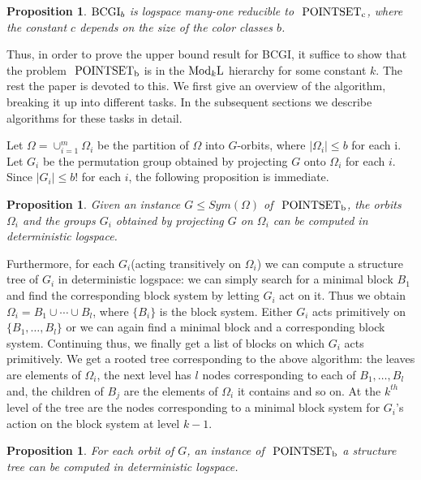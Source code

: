 \documentclass[11pt]{article}
\newtheorem{proposition}[theorem]{Proposition}
\newcommand{\ModkL}{\mbox{\rm Mod$_k$L}}
\newcommand{\BCGI}{\mbox{\rm BCGI}}
\newcommand{\psb}[2]{\mbox{\ensuremath{\rm{#1~}{POINTSET}_{#2}}}}
\begin{document}
\begin{proposition}\label{thm-red}
$\BCGI_b$ is logspace many-one reducible to $\psb{}{c}$, where the
constant $c$ depends on the size of the color classes $b$.
\end{proposition}

Thus, in order to prove the upper bound result for BCGI, it suffice to
show that the problem $\psb{}{b}$ is in the $\ModkL$ hierarchy for
some constant $k$. The rest the paper is devoted to this. We first
give an overview of the algorithm, breaking it up into different
tasks. In the subsequent sections we describe algorithms for these
tasks in detail.

Let $\Omega=\cup_{i=1}^{m}\Omega_i$ be the partition of $\Omega$ into
$G$-orbits, where $|\Omega_i|\leq b$ for each i. Let $G_i$ be the
permutation group obtained by projecting $G$ onto $\Omega_i$ for each
$i$. Since $|G_i|\leq b!$ for each $i$, the following proposition is
immediate.

\begin{proposition}
  Given an instance $G\leq Sym(\Omega)$ of $\psb{}{b}$, the orbits
  $\Omega_i$ and the groups $G_i$ obtained by projecting $G$ on
  $\Omega_i$ can be computed in deterministic logspace.
\end{proposition}

Furthermore, for each $G_i$(acting transitively on $\Omega_i$) we can
compute a structure tree of $G_i$ in deterministic logspace: we can
simply search for a minimal block $B_1$ and find the corresponding
block system by letting $G_i$ act on it. Thus we obtain
$\Omega_i=B_1\cup\cdots\cup B_l$, where $\{B_i\}$ is the block system.
Either $G_i$ acts primitively on $\{B_1,\ldots,B_l\}$ or we can again
find a minimal block and a corresponding block system. Continuing
thus, we finally get a list of blocks on which $G_i$ acts primitively.
We get a rooted tree corresponding to the above algorithm: the leaves
are elements of $\Omega_i$, the next level has $l$ nodes corresponding
to each of $B_1,\ldots,B_l$ and, the children of $B_j$ are the
elements of $\Omega_i$ it contains and so on. At the $k^{th}$ level of
the tree are the nodes corresponding to a minimal block system for
$G_i$'s action on the block system at level $k-1$.

\begin{proposition}
For each orbit of $G$, an instance of $\psb{}{b}$ a structure tree can
be computed in deterministic logspace.
\end{proposition}
\end{document}
